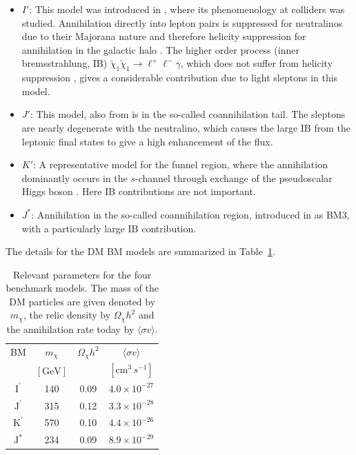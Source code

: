 \documentclass[10pt,aps,pra,reprint,amsmath,amsfonts,amssymb,showpacs,nofootinbib,floatfix]{revtex4-1}
\newcommand{\rmn}{\mathrm}
\newcommand{\Kp}{\rmn{K}^\prime}
\newcommand{\Ip}{\rmn{I}^\prime}
\newcommand{\Js}{\rmn{J}^*}
\newcommand{\Jp}{\rmn{J}^\prime}
\newcommand{\sigmaannv}{\ensuremath{\langle\sigma v\rangle}}
\begin{document}
\begin{itemize}
\item
 $I′$: This model was introduced in \cite{2004EPJC...33..273B}, where
  its phenomenology at colliders was studied. Annihilation directly
  into lepton pairs is suppressed for neutralinos due to their
  Majorana nature and therefore helicity suppression for annihilation
  in the galactic halo \cite{1983PhRvL..50.1419G}. The higher order
  process (inner bremsstrahlung, IB) $\tilde\chi_1\tilde\chi_1\to
  \ell^+\ell^-\gamma$, which does not suffer from helicity suppression
  \cite{1989PhLB..225..372B,2008JHEP...01..049B}, gives a considerable
  contribution due to light sleptons in this model.

\item $J′$: This model, also from \cite{2004EPJC...33..273B} is in the
  so-called coannihilation tail. The sleptons are nearly degenerate
  with the neutralino, which causes the large IB from the leptonic
  final states to give a high enhancement of the flux.

\item $K′$: A representative model for the funnel region, where the
  annihilation dominantly occurs in the $s$-channel through exchange
  of the pseudoscalar Higgs boson \cite{2004EPJC...33..273B}. Here IB
  contributions are not important.

\item $J^*$: Annihilation in the so-called coannihilation region,
  introduced in \cite{2008JHEP...01..049B} as BM3, with a particularly
  large IB contribution.

\end{itemize}

The details for the DM BM models are summarized in Table~\ref{tab:BMpara}.

\begin{table}
\begin{tabular}{cccc}
\hline\hline
      BM &  $m_{\chi}$     & $\Omega_{\chi} h^2$ & $\sigmaannv$\\
         &  $[\rmn{GeV}]$ &                    & $[\rmn{cm}^3\,s^{-1}]$\\
\hline
$\Ip$  & 140 & 0.09 & $4.0\times 10^{-27}$ \\
$\Jp$  & 315 & 0.12 & $3.3\times 10^{-28}$ \\
$\Kp$  & 570 & 0.10 & $4.4\times 10^{-26}$ \\
$\Js$  & 234 & 0.09 & $8.9\times 10^{-29}$ \\
\hline\hline
\end{tabular}
 \caption{Relevant parameters for the four benchmark models. The mass
   of the DM particles are given denoted by $m_{\chi}$, the relic
   density by $\Omega_{\chi} h^2$ and the annihilation rate today by
   $\sigmaannv$.\label{tab:BMpara}}
\end{table}
\end{document}
